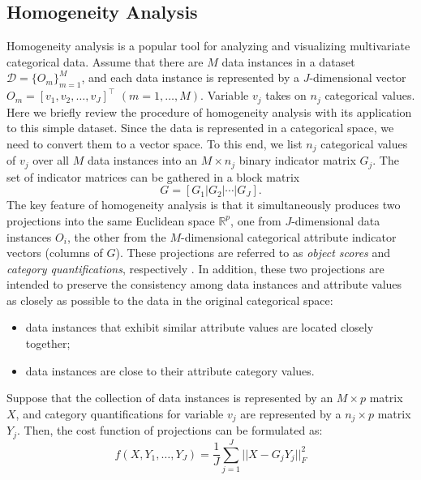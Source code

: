\documentclass[a4paper]{article}
\begin{document}
\subsection{Homogeneity Analysis}
\label{subsec:HA}
Homogeneity analysis \citep{gifi} is a popular tool for analyzing and visualizing multivariate categorical data.  
Assume that there are $M$ data instances in a dataset $\mathcal{D}=\{O_m\}_{m=1}^M$, and each data instance is  
represented by a $J$-dimensional vector $O_m=[v_1,v_2,\dots, v_J]^\top$ $(m = 1,\dots,M)$. 
Variable $v_j$ takes on $n_j$ categorical values. Here we briefly review the procedure of homogeneity analysis with its 
application to this simple dataset. 
Since the data is represented in a categorical space, 
we need to convert them to a vector space.    
To this end, we list $n_j$ categorical values of $v_j$ over all $M$ data instances into an $M\times n_j$ binary indicator matrix $G_j$.  The set of indicator matrices 
can be gathered in a block matrix
\begin{equation}
  G=[G_1 | G_2 | \cdots | G_J].
\end{equation}
The key feature of homogeneity analysis is that it simultaneously
produces two projections into the same Euclidean space $\mathbb{R}^p$,
one from $J$-dimensional data instances $O_i$, the other from the
$M$-dimensional categorical attribute indicator vectors (columns of
$G$).  These projections are referred to as \emph{object 
scores} and \emph{category quantifications}, respectively \citep{gifi}. 
In addition, these two projections are intended to preserve the consistency among data instances and 
attribute values as closely as possible to the data in the original categorical space:
\begin{itemize}
    \item data instances that exhibit similar attribute values are located closely together; 
    \item data instances are close to their attribute category values.
\end{itemize}
Suppose that the collection of data instances is represented by an $M\times p$ matrix $X$, and category quantifications for variable $v_j$ are represented by 
a $n_j\times p$ matrix $Y_j$. Then, the cost function of projections can be formulated as:
\begin{equation} 
    f(X,Y_1,\ldots, Y_J)=\frac{1}{J} \sum_{j=1}^{J} ||X-G_j Y_j||_F^2 
  \label{equ:cost_function}
\end{equation}
\end{document}
